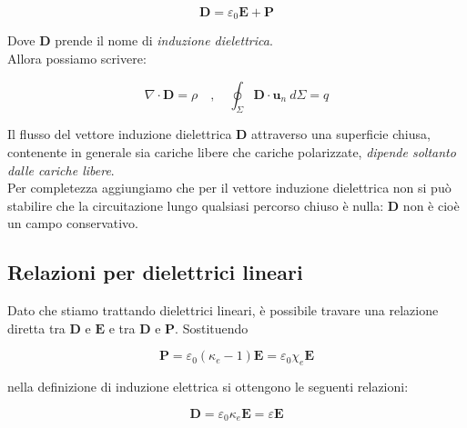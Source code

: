 \begin{tcolorbox}[colback=yellow!10!white, colframe=orange!70!black, boxrule=0.8pt]
\begin{equation}
    \mathbf{D} = \varepsilon_0 \mathbf{E} + \mathbf{P}
\end{equation}
\end{tcolorbox}

Dove $\mathbf{D}$ prende  il nome di \emph{induzione dielettrica}. \\

Allora possiamo scrivere:

\begin{tcolorbox}[colback=yellow!10!white, colframe=orange!70!black, boxrule=0.8pt]
\begin{equation}
    \nabla \cdot \mathbf{D} = \rho \quad , \quad \oint_{\Sigma} \mathbf{D} \cdot \mathbf{u}_n \ d \Sigma = q
\end{equation}
\end{tcolorbox}

Il flusso del vettore induzione dielettrica $\mathbf{D}$ attraverso una superficie chiusa, contenente in generale sia cariche libere che cariche polarizzate, \emph{dipende soltanto dalle cariche libere}. \\

Per completezza aggiungiamo che per il vettore induzione dielettrica non si può stabilire che la circuitazione lungo qualsiasi percorso chiuso è nulla: $\mathbf{D}$ non è cioè un campo conservativo. \\

\subsection{Relazioni per dielettrici lineari}

Dato che stiamo trattando dielettrici lineari, è possibile travare una relazione diretta tra $\mathbf{D}$ e $\mathbf{E}$ e tra $\mathbf{D}$ e $\mathbf{P}$. Sostituendo

\begin{equation*}
    \mathbf{P} = \varepsilon_0 (\kappa_e - 1) \mathbf{E} = \varepsilon_0 \chi_e \mathbf{E}
\end{equation*}

nella definizione di induzione elettrica si ottengono le seguenti relazioni:

\begin{tcolorbox}[colback=yellow!10!white, colframe=orange!70!black, boxrule=0.8pt]
\begin{equation}
    \mathbf{D} = \varepsilon_0 \kappa_e \mathbf{E} = \varepsilon \mathbf{E}
    \label{eq:legame_D_E}
\end{equation}
\end{tcolorbox}

